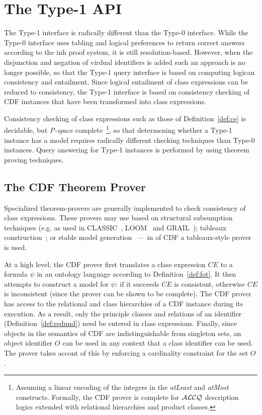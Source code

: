 \section{The Type-1 API} \label{sec:type1query}

The Type-1 interface is radically different than the Type-0 interface.
While the Type-0 interface uses tabling and logical preferences to
return correct answers according to the {\sc inh} proof system, it is
still resolution-based.  However, when the disjunction and negation of
virdual identifiers is added such an approach is no longer possible,
so that the Type-1 query interface is based on computing logican
consistency and entailment.  Since logical entailment of class
expressions can be reduced to consistency, the Type-1 interface is
based on consistency checking of CDF instances that have been
transformed into class expressions.

Consistency checking of class expressions such as those of
Definition~\ref{def:ce} is decidable, but {\em P-space}
complete~\footnote{Assuming a linear encoding of the integers in the
{\em atLeast} and {\em atMost} constructs.  Formally, the CDF prover
is complete for ${\cal ALCQ}$ description logics extended with
relational hierarchies and product classes.}, so that determening
whether a Type-1 instance has a model requires radically different
checking techniques than Type-0 instances.  Query answering for Type-1
instances is performed by using theorem proving techniques.

\subsection{The CDF Theorem Prover}

Specialized theorem-provers are generally implemented to check
consistency of class expressions.  These provers may use based on
structural subsumption techniques (e.g. as used in
CLASSIC~\cite{PMBRB91}, LOOM~\cite{MacB94} and GRAIL~\cite{RBGHNS97});
tableaux construction~\cite{HoPS99}; or stable model
generation~\cite{Swif04} --- in \version{} of CDF a tableaux-style
prover is used.

At a high level, the CDF prover first translates a class expression
$CE$ to a formula $\psi$ in an ontology language according to
Definition~\ref{def:fot}.  It then attempts to construct a model for
$\psi$: if it succeeds $CE$ is consistent, otherwise $CE$ is
inconsistent (since the prover can be shown to be complete).  The CDF
prover has access to the relational and class hierarchies of a CDF
instance during its execution.  As a result, only the principle
classes and relations of an identifier (Definition~\ref{def:redund})
need be entered in class expressions.  Finally, since objects in the
semantics of CDF are indistinguishable from singleton sets, an object
identifier $O$ can be used in any context that a class identifier can
be used.  The prover takes accont of this by enforcing a cardinality
constraint for the set $O$.

